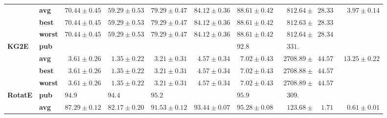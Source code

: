 \begin{tabular}{llrrrrrrr}
       & \textbf{avg} &            $70.44 \pm 0.45$ &            $59.29 \pm 0.53$ &            $79.29 \pm 0.47$ &            $84.12 \pm 0.36$ &            $88.61 \pm 0.42$ &  $\phantom{00}812.64 \pm \phantom{0}28.33$ &  $\phantom{00}3.97 \pm 0.14$ \\
       & \textbf{best} &            $70.44 \pm 0.45$ &            $59.29 \pm 0.53$ &            $79.29 \pm 0.47$ &            $84.12 \pm 0.36$ &            $88.61 \pm 0.42$ &  $\phantom{00}812.63 \pm \phantom{0}28.33$ &                              \\
       & \textbf{worst} &            $70.44 \pm 0.45$ &            $59.29 \pm 0.53$ &            $79.29 \pm 0.47$ &            $84.12 \pm 0.36$ &            $88.61 \pm 0.42$ &  $\phantom{00}812.64 \pm \phantom{0}28.34$ &                              \\
\textbf{KG2E} & \textbf{pub} &                             &                             &                             &                             &  $92.8\phantom{0 \pm 0.00}$ &  $\phantom{00}331.\phantom{00 \pm 000.00}$ &                              \\
       & \textbf{avg} &  $\phantom{0}3.61 \pm 0.26$ &  $\phantom{0}1.35 \pm 0.22$ &  $\phantom{0}3.21 \pm 0.31$ &  $\phantom{0}4.57 \pm 0.34$ &  $\phantom{0}7.02 \pm 0.43$ &  $\phantom{0}2708.89 \pm \phantom{0}44.57$ &  $\phantom{0}13.25 \pm 0.22$ \\
       & \textbf{best} &  $\phantom{0}3.61 \pm 0.26$ &  $\phantom{0}1.35 \pm 0.22$ &  $\phantom{0}3.21 \pm 0.31$ &  $\phantom{0}4.57 \pm 0.34$ &  $\phantom{0}7.02 \pm 0.43$ &  $\phantom{0}2708.88 \pm \phantom{0}44.57$ &                              \\
       & \textbf{worst} &  $\phantom{0}3.61 \pm 0.26$ &  $\phantom{0}1.35 \pm 0.22$ &  $\phantom{0}3.21 \pm 0.31$ &  $\phantom{0}4.57 \pm 0.34$ &  $\phantom{0}7.02 \pm 0.43$ &  $\phantom{0}2708.89 \pm \phantom{0}44.57$ &                              \\
\textbf{RotatE} & \textbf{pub} &  $94.9\phantom{0 \pm 0.00}$ &  $94.4\phantom{0 \pm 0.00}$ &  $95.2\phantom{0 \pm 0.00}$ &                             &  $95.9\phantom{0 \pm 0.00}$ &  $\phantom{00}309.\phantom{00 \pm 000.00}$ &                              \\
       & \textbf{avg} &            $87.29 \pm 0.12$ &            $82.17 \pm 0.20$ &            $91.53 \pm 0.12$ &            $93.44 \pm 0.07$ &            $95.28 \pm 0.08$ &  $\phantom{00}123.68 \pm \phantom{00}1.71$ &  $\phantom{00}0.61 \pm 0.01$ \\

\end{tabular}
